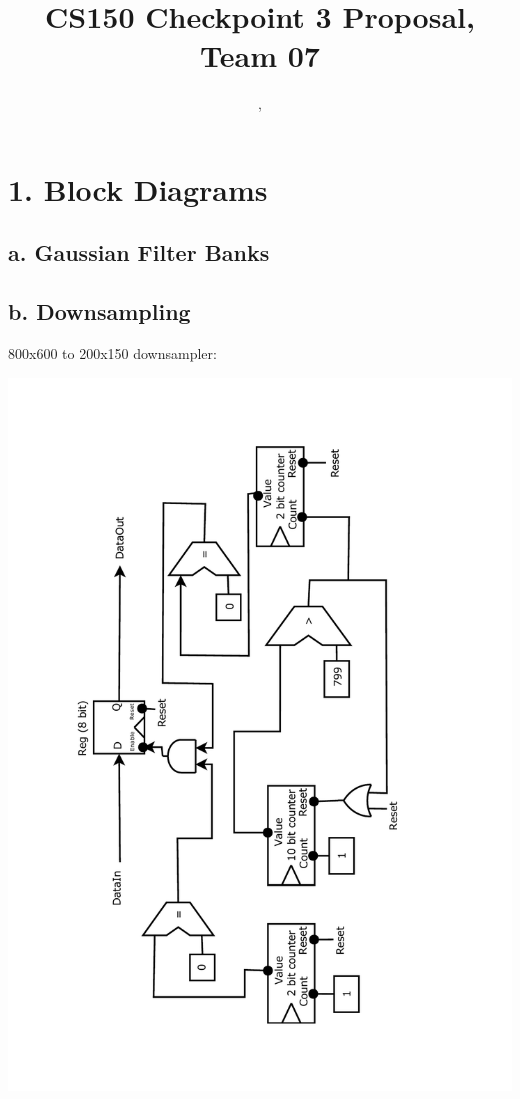 \documentclass[11pt]{article}
\title{CS150 Checkpoint 3 Proposal, Team 07}
\author{\Name, \texttt{\Login}}
\begin{document}
\maketitle
\section*{1. Block Diagrams}

\subsection*{a. Gaussian Filter Banks}

\subsection*{b. Downsampling}

800x600 to 200x150 downsampler:

\includegraphics[scale=0.5, angle=270]{diagrams/downsampler/Downsample.pdf}
\end{document}
